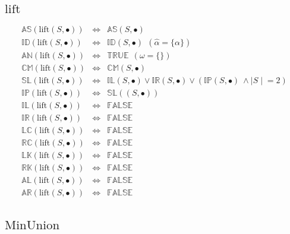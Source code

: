 \documentclass[10pt]{article}
\newcommand{\propname}[1]{{\mathbb{#1}}}
\begin{document}
\subsection{$\mathrm{lift}$} 
\[
\begin{array}{rcl} 
\propname{AS}(\mathrm{lift}(S, \bullet)) 
   & \Leftrightarrow 
   & \propname{AS}(S, \bullet) \\ 
\propname{ID}(\mathrm{lift}(S, \bullet)) 
   & \Leftrightarrow 
   & \propname{ID}(S, \bullet)  \ \ (\hat{\alpha} = \{\alpha\})\\ 
\propname{AN}(\mathrm{lift}(S, \bullet)) 
   & \Leftrightarrow 
   & \propname{TRUE} \ \ (\omega = \{\})\\ 
\propname{CM}(\mathrm{lift}(S, \bullet)) 
   & \Leftrightarrow 
   & \propname{CM}(S, \bullet) \\ 
\propname{SL}(\mathrm{lift}(S, \bullet)) 
   & \Leftrightarrow 
   & \propname{IL}(S, \bullet) 
     \vee \propname{IR}(S, \bullet) 
     \vee (\propname{IP}(S, \bullet)\ \wedge {\mid S \mid} = 2) \\ 
\propname{IP}(\mathrm{lift}(S, \bullet)) 
   & \Leftrightarrow 
   & \propname{SL}((S, \bullet)) \\ 
\propname{IL}(\mathrm{lift}(S, \bullet)) 
   & \Leftrightarrow 
   & \propname{FALSE} \\ 
\propname{IR}(\mathrm{lift}(S, \bullet)) 
   & \Leftrightarrow 
   & \propname{FALSE} \\ 
\propname{LC}(\mathrm{lift}(S, \bullet)) 
   & \Leftrightarrow 
   & \propname{FALSE} \\ 
\propname{RC}(\mathrm{lift}(S, \bullet)) 
   & \Leftrightarrow 
   & \propname{FALSE} \\ 
\propname{LK}(\mathrm{lift}(S, \bullet)) 
   & \Leftrightarrow 
   & \propname{FALSE} \\ 
\propname{RK}(\mathrm{lift}(S, \bullet)) 
   & \Leftrightarrow 
   & \propname{FALSE} \\  
\propname{AL}(\mathrm{lift}(S, \bullet))  
   & \Leftrightarrow 
   & \propname{FALSE} \\
\propname{AR}(\mathrm{lift}(S, \bullet))  
   & \Leftrightarrow 
   & \propname{FALSE} \\ 
\end{array} 
\]

\subsection{$\mathrm{MinUnion}$} 
\end{document}
